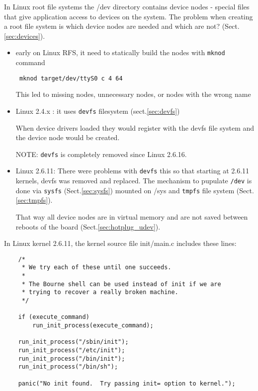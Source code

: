 In Linux root file systems the /dev directory contains device nodes - special
files that give application access to devices on the system.
The problem when creating a root file system is which device nodes are needed
and which are not? (Sect.\ref{sec:devices}).
\begin{itemize}
  \item early on Linux RFS, it need to statically build the nodes with
  \verb!mknod! command
\begin{verbatim}
 mknod target/dev/ttyS0 c 4 64
\end{verbatim}
This led to missing nodes, unnecessary nodes, or nodes with the wrong name

  \item Linux 2.4.x : it uses \verb!devfs! filesystem (sect.\ref{sec:devfs})
  
  When device drivers loaded they would register with the devfs file system and
  the device node would be created. 

NOTE: \verb!devfs! is completely removed since Linux 2.6.16.
  
  \item Linux 2.6.11:  There were problems with \verb!devfs! this so that starting at 2.6.11 kernels,
  devfs was removed and replaced. The mechanism to pupulate \verb!/dev! is done
  via \verb!sysfs! (Sect.\ref{sec:sysfs}) mounted on /sys and \verb!tmpfs! file
  system (Sect.\ref{sec:tmpfs}).
  
%   
  
  That way all device nodes are in virtual memory and are not saved between
  reboots of the board (Sect.\ref{sec:hotplug_udev}).
  
 
  
\end{itemize}



In Linux kernel 2.6.11, the kernel source file init/main.c includes these lines:
\begin{verbatim}
    /*
     * We try each of these until one succeeds.
     *
     * The Bourne shell can be used instead of init if we are
     * trying to recover a really broken machine.
     */

    if (execute_command)
        run_init_process(execute_command);

    run_init_process("/sbin/init");
    run_init_process("/etc/init");
    run_init_process("/bin/init");
    run_init_process("/bin/sh");

    panic("No init found.  Try passing init= option to kernel.");
\end{verbatim}



